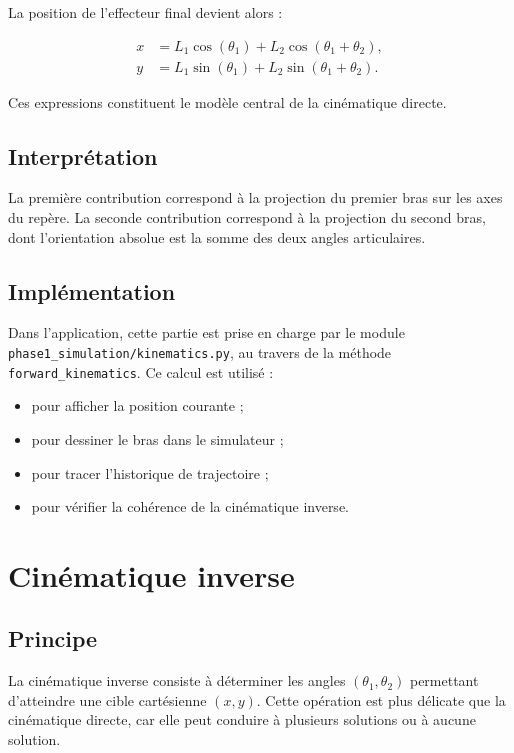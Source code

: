 \documentclass[12pt,a4paper]{report}
\newcommand{\Lone}{L_1}
\newcommand{\Ltwo}{L_2}
\newcommand{\thone}{\theta_1}
\newcommand{\thtwo}{\theta_2}
\begin{document}
La position de l'effecteur final devient alors :

\begin{align}
    x &= \Lone \cos(\thone) + \Ltwo \cos(\thone + \thtwo), \label{eq:fkx} \\
    y &= \Lone \sin(\thone) + \Ltwo \sin(\thone + \thtwo). \label{eq:fky}
\end{align}

Ces expressions constituent le modèle central de la cinématique directe.

\subsection{Interprétation}

La première contribution correspond à la projection du premier bras sur les axes du
repère. La seconde contribution correspond à la projection du second bras, dont
l'orientation absolue est la somme des deux angles articulaires.

\subsection{Implémentation}

Dans l'application, cette partie est prise en charge par le module
\texttt{phase1\_simulation/kinematics.py}, au travers de la méthode
\texttt{forward\_kinematics}. Ce calcul est utilisé :

\begin{itemize}
    \item pour afficher la position courante ;
    \item pour dessiner le bras dans le simulateur ;
    \item pour tracer l'historique de trajectoire ;
    \item pour vérifier la cohérence de la cinématique inverse.
\end{itemize}

\section{Cinématique inverse}

\subsection{Principe}

La cinématique inverse consiste à déterminer les angles $(\thone,\thtwo)$ permettant
d'atteindre une cible cartésienne $(x,y)$. Cette opération est plus délicate que la
cinématique directe, car elle peut conduire à plusieurs solutions ou à aucune solution.
\end{document}
